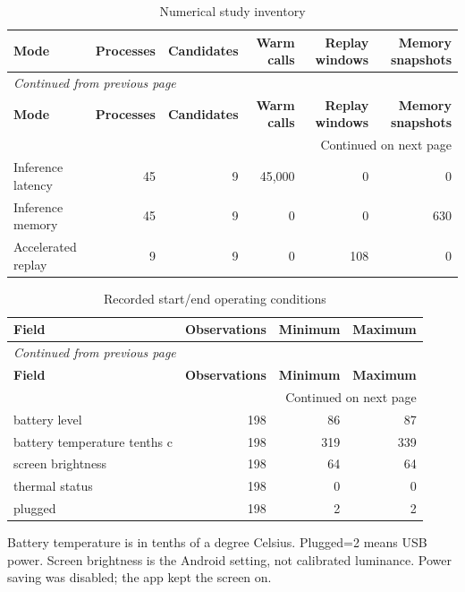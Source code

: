 \documentclass[10pt,a4paper]{article}
\begin{document}
\begingroup\small\setlength{\tabcolsep}{4pt}\renewcommand{\arraystretch}{1.12}
\begin{longtable}{@{}lrrrrr@{}}
\caption{Numerical study inventory}\\
\toprule
\textbf{Mode} & \textbf{Processes} & \textbf{Candidates} & \textbf{Warm calls} & \textbf{Replay windows} & \textbf{Memory snapshots} \\
\midrule\endfirsthead
\multicolumn{6}{l}{\small\itshape Continued from previous page}\\
\toprule
\textbf{Mode} & \textbf{Processes} & \textbf{Candidates} & \textbf{Warm calls} & \textbf{Replay windows} & \textbf{Memory snapshots} \\
\midrule\endhead
\midrule\multicolumn{6}{r}{\small Continued on next page}\\\endfoot
\bottomrule\endlastfoot
Inference latency & 45 & 9 & 45,000 & 0 & 0 \\
Inference memory & 45 & 9 & 0 & 0 & 630 \\
Accelerated replay & 9 & 9 & 0 & 108 & 0 \\
\end{longtable}\endgroup
\begingroup\small\setlength{\tabcolsep}{4pt}\renewcommand{\arraystretch}{1.12}
\begin{longtable}{@{}lrrr@{}}
\caption{Recorded start/\allowbreak{}end operating conditions}\\
\toprule
\textbf{Field} & \textbf{Observations} & \textbf{Minimum} & \textbf{Maximum} \\
\midrule\endfirsthead
\multicolumn{4}{l}{\small\itshape Continued from previous page}\\
\toprule
\textbf{Field} & \textbf{Observations} & \textbf{Minimum} & \textbf{Maximum} \\
\midrule\endhead
\midrule\multicolumn{4}{r}{\small Continued on next page}\\\endfoot
\bottomrule\endlastfoot
battery level & 198 & 86 & 87 \\
battery temperature tenths c & 198 & 319 & 339 \\
screen brightness & 198 & 64 & 64 \\
thermal status & 198 & 0 & 0 \\
plugged & 198 & 2 & 2 \\
\end{longtable}\endgroup
\noindent\small Battery temperature is in tenths of a degree Celsius. Plugged=2 means USB power. Screen brightness is the Android setting, not calibrated luminance. Power saving was disabled; the app kept the screen on.\normalsize\par\medskip
\end{document}

